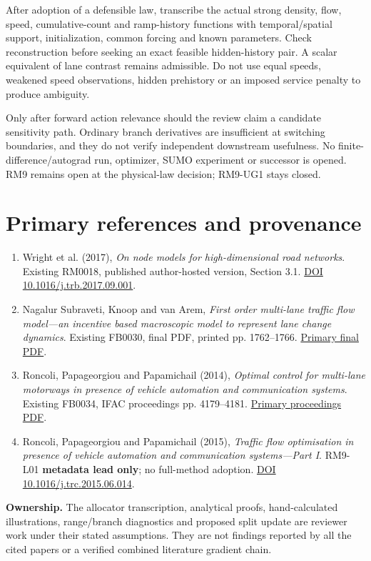 \documentclass[10pt,a4paper]{article}
\begin{document}
After adoption of a defensible law, transcribe the actual strong density,
flow, speed, cumulative-count and ramp-history functions with temporal/spatial
support, initialization, common forcing and known parameters. Check reconstruction
before seeking an exact feasible hidden-history pair. A scalar equivalent of
lane contrast remains admissible. Do not use equal speeds, weakened speed
observations, hidden prehistory or an imposed service penalty to produce ambiguity.

Only after forward action relevance should the review claim a candidate
sensitivity path. Ordinary branch derivatives are insufficient at switching
boundaries, and they do not verify independent downstream usefulness. No
finite-difference/autograd run, optimizer, SUMO experiment or successor is
opened. RM9 remains open at the physical-law decision; RM9-UG1 stays closed.

\section*{Primary references and provenance}
\begin{enumerate}
\item Wright et al. (2017), \emph{On node models for high-dimensional road
networks}. Existing RM0018, published author-hosted version, Section 3.1.
\href{https://doi.org/10.1016/j.trb.2017.09.001}{DOI 10.1016/j.trb.2017.09.001}.
\item Nagalur Subraveti, Knoop and van Arem, \emph{First order multi-lane
traffic flow model---an incentive based macroscopic model to represent lane
change dynamics}. Existing FB0030, final PDF, printed pp. 1762--1766.
\href{https://repository.tudelft.nl/file/File_2c4359e7-5e5a-4651-964f-6f3610ab89ae}{Primary final PDF}.
\item Roncoli, Papageorgiou and Papamichail (2014), \emph{Optimal control for
multi-lane motorways in presence of vehicle automation and communication systems}.
Existing FB0034, IFAC proceedings pp. 4179--4181.
\href{https://skoge.folk.ntnu.no/prost/proceedings/ifac2014/media/files/1657.pdf}{Primary proceedings PDF}.
\item Roncoli, Papageorgiou and Papamichail (2015), \emph{Traffic flow optimisation
in presence of vehicle automation and communication systems---Part I}.
RM9-L01 \textbf{metadata lead only}; no full-method adoption.
\href{https://doi.org/10.1016/j.trc.2015.06.014}{DOI 10.1016/j.trc.2015.06.014}.
\end{enumerate}
\noindent\textbf{Ownership.} The allocator transcription, analytical proofs,
hand-calculated illustrations, range/branch diagnostics and proposed split
update are reviewer work under their stated assumptions. They are not findings
reported by all the cited papers or a verified combined literature gradient chain.
\end{document}
